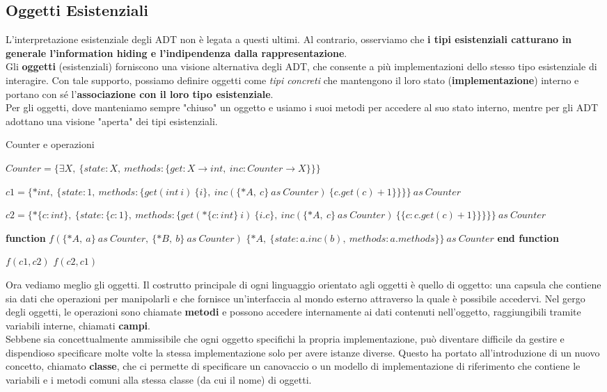 \documentclass[a4paper,12pt]{article}
\begin{document}
\subsection{Oggetti Esistenziali}
L’interpretazione esistenziale degli ADT non è legata a questi ultimi. Al contrario,
osserviamo che \textbf{i tipi esistenziali catturano in generale l'information hiding e
l'indipendenza dalla rappresentazione}.\\
Gli \textbf{oggetti} (esistenziali) forniscono una visione alternativa degli ADT, che
consente a più implementazioni dello stesso tipo esistenziale di interagire. Con tale supporto, possiamo definire oggetti come \textit{tipi concreti} che
mantengono il loro stato (\textbf{implementazione}) interno e portano con sé
l'\textbf{associazione con il loro tipo esistenziale}.\\
Per gli oggetti, dove manteniamo sempre "chiuso" un oggetto e
usiamo i suoi metodi per accedere al suo stato interno, mentre per gli ADT adottano una visione "aperta" dei tipi esistenziali.\\
\begin{algorithm}[H]
\caption{Counter e operazioni}
\begin{algorithmic}

\State $Counter = \{ \exists X,\ \{ state : X,\ methods :
\{ get : X \to int,\ inc : Counter \to X \} \} \}$

\State $c1 = \{ *int,\ \{ state : 1,\ methods :
\{ get(int\ i)\ \{ i \},\
inc(\{*A,\ c\}\ as\ Counter)\ \{ c.get(c) + 1 \} \} \} \}\ as\ Counter$

\State $c2 = \{ *\{c : int\},\ \{ state : \{c : 1\},\ methods :
\{ get(*\{c : int\}\ i)\ \{ i.c \},\
inc(\{*A,\ c\}\ as\ Counter)\ \{ \{c : c.get(c) + 1\} \} \} \} \}\ as\ Counter$

\State \textbf{function} $f(\{*A,\ a\}\ as\ Counter,\ \{*B,\ b\}\ as\ Counter)$
\State \hspace{1em} $\{*A,\ \{ state : a.inc(b),\ methods : a.methods \} \}\ as\ Counter$
\State \textbf{end function}

\State $f(c1, c2)$
\State $f(c2, c1)$

\end{algorithmic}
\end{algorithm}
Ora vediamo meglio gli oggetti. Il costrutto principale di ogni linguaggio orientato agli oggetti è quello di oggetto: una
capsula che contiene sia dati che operazioni per manipolarli e che fornisce un'interfaccia
al mondo esterno attraverso la quale è possibile accedervi. Nel gergo degli oggetti, le operazioni sono chiamate \textbf{metodi} e possono accedere
internamente ai dati contenuti nell'oggetto, raggiungibili tramite variabili interne,
chiamati \textbf{campi}.\\
Sebbene sia concettualmente ammissibile che ogni oggetto specifichi la
propria implementazione, può diventare difficile da gestire e dispendioso
specificare molte volte la stessa implementazione solo per avere istanze
diverse. Questo ha portato all'introduzione di un nuovo concetto, chiamato \textbf{classe}, che
ci permette di specificare un canovaccio o un modello di implementazione di
riferimento che contiene le variabili e i metodi comuni alla stessa classe (da
cui il nome) di oggetti.
\end{document}
